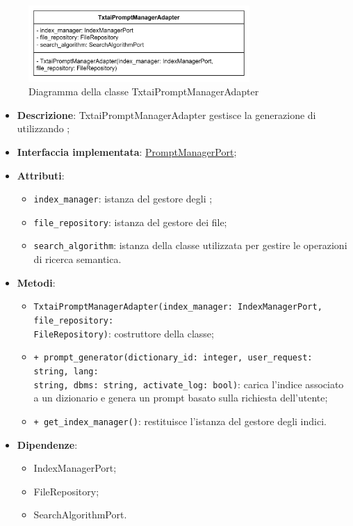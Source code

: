  \label{TxtaiPromptManagerAdapter}
\begin{figure}[H]
    \centering
    \includegraphics[width=0.75\textwidth]{assets/Backend/txtai_prompt_manager_adapter.png}
    \caption{Diagramma della classe TxtaiPromptManagerAdapter}
  \end{figure}
\begin{itemize}
    \item \textbf{Descrizione}: TxtaiPromptManagerAdapter gestisce la generazione di  utilizzando ;
    \item \textbf{Interfaccia implementata}: \hyperref[PromptManagerPort]{PromptManagerPort};
    \item \textbf{Attributi}:
    \begin{itemize}
        \item \texttt{index\_manager}: istanza del gestore degli ;
        \item \texttt{file\_repository}: istanza del gestore dei file;
        \item \texttt{search\_algorithm}: istanza della classe utilizzata per gestire le operazioni di ricerca semantica.
    \end{itemize}
    \item \textbf{Metodi}:
    \begin{itemize}
        \item \texttt{TxtaiPromptManagerAdapter(index\_manager: IndexManagerPort, file\_repository:\\ FileRepository)}: costruttore della classe;
        \item \texttt{+ prompt\_generator(dictionary\_id: integer, user\_request: string, lang:\\ string, dbms: string, activate\_log: bool)}: carica l'indice associato a un dizionario e genera un prompt basato sulla richiesta dell'utente;
        \item \texttt{+ get\_index\_manager()}: restituisce l'istanza del gestore degli indici.
    \end{itemize}
    \item \textbf{Dipendenze}:
    \begin{itemize}
        \item IndexManagerPort;
        \item FileRepository;
        \item SearchAlgorithmPort.
    \end{itemize}
\end{itemize} 

